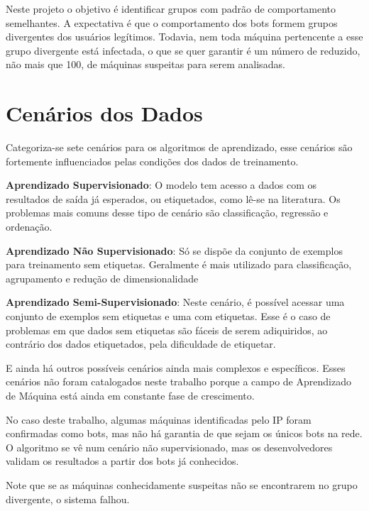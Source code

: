 Neste projeto o objetivo é identificar grupos com padrão de comportamento semelhantes. A expectativa é que o comportamento dos bots formem grupos divergentes dos usuários legítimos. Todavia, nem toda máquina pertencente a esse grupo divergente está infectada, o que se quer garantir é um número de reduzido, não mais que 100, de máquinas suspeitas para serem analisadas.

\section{Cenários dos Dados}

Categoriza-se \citep{mohri2012foundations} sete cenários para os algoritmos de aprendizado, esse cenários são fortemente influenciados pelas condições dos dados de treinamento.

\begin{description}
\item \textbf{Aprendizado Supervisionado}: O modelo tem acesso a dados com os resultados de saída já esperados, ou etiquetados, como lê-se na literatura. Os problemas mais comuns desse tipo de cenário são classificação, regressão e ordenação.

\item \textbf{Aprendizado Não Supervisionado}: Só se dispõe da conjunto de exemplos para treinamento sem etiquetas. Geralmente é mais utilizado para classificação, agrupamento e redução de dimensionalidade

\item \textbf{Aprendizado Semi-Supervisionado}: Neste cenário, é possível acessar uma conjunto de exemplos sem etiquetas e uma com etiquetas. Esse é o caso de problemas em que dados sem etiquetas são fáceis de serem adiquiridos, ao contrário dos dados etiquetados, pela dificuldade de etiquetar.

\end{description}

E ainda há outros possíveis cenários ainda mais complexos e específicos. Esses cenários não foram catalogados neste trabalho porque a campo de Aprendizado de Máquina está ainda em constante fase de crescimento.

No caso deste trabalho, algumas máquinas identificadas pelo IP foram confirmadas como bots, mas não há garantia de que sejam os únicos bots na rede. O algoritmo se vê num cenário não supervisionado, mas os desenvolvedores validam os resultados a partir dos bots já conhecidos.

Note que se as máquinas conhecidamente suspeitas não se encontrarem no grupo divergente, o sistema falhou.

